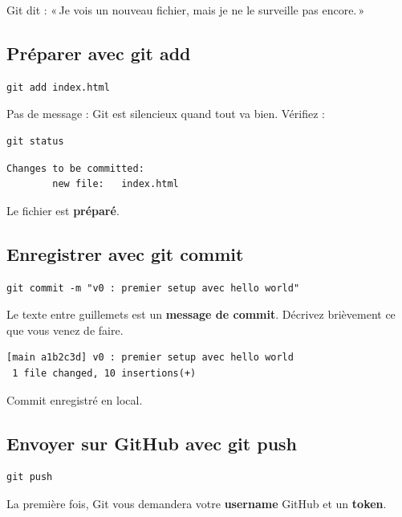 \documentclass[11pt,a4paper]{article}
\newcommand{\cmark}{\ding{51}}
\begin{document}
Git dit : «\,Je vois un nouveau fichier, mais je ne le surveille pas encore.\,»

\subsection{Préparer avec git add}

\begin{lstlisting}
git add index.html
\end{lstlisting}

Pas de message : Git est silencieux quand tout va bien. Vérifiez :

\begin{lstlisting}
git status
\end{lstlisting}

\begin{lstlisting}
Changes to be committed:
        new file:   index.html
\end{lstlisting}

Le fichier est \textbf{préparé}.

\subsection{Enregistrer avec git commit}

\begin{lstlisting}
git commit -m "v0 : premier setup avec hello world"
\end{lstlisting}

Le texte entre guillemets est un \textbf{message de commit}. Décrivez
brièvement ce que vous venez de faire.

\begin{lstlisting}
[main a1b2c3d] v0 : premier setup avec hello world
 1 file changed, 10 insertions(+)
\end{lstlisting}

\cmark{} Commit enregistré en local.

\subsection{Envoyer sur GitHub avec git push}

\begin{lstlisting}
git push
\end{lstlisting}

La première fois, Git vous demandera votre \textbf{username} GitHub et un
\textbf{token}.
\end{document}
